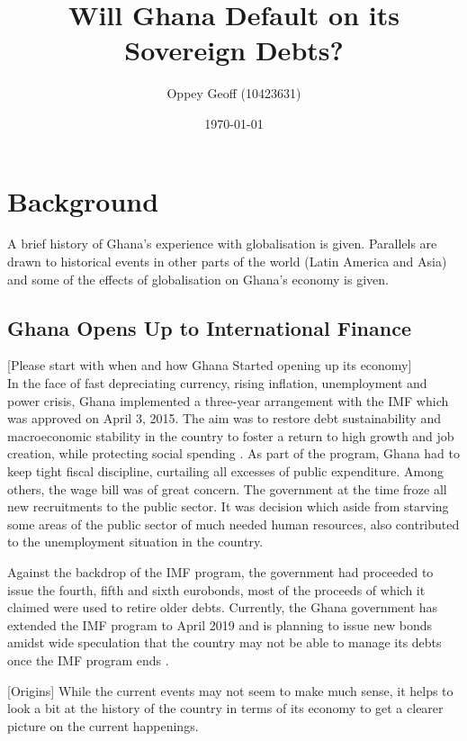 \documentclass[a4paper, 12pt]{article}
\author{Oppey Geoff (10423631)}
\title{Will Ghana Default on its Sovereign Debts?}
\date{\today}
\begin{document}
	\maketitle
	\clearpage
	\tableofcontents
	\newpage
	\doublespacing

	\section{Background}
	A brief history of Ghana's experience with globalisation is given. Parallels are drawn to historical events in other parts of the world (Latin America and Asia) and some of the effects of globalisation on Ghana's economy is given.
	
	\subsection{Ghana Opens Up to International Finance}
	[Please start with when and how Ghana Started opening up its economy]\\
	In the face of fast depreciating currency, rising inflation, unemployment and power crisis, Ghana implemented a three-year arrangement with the IMF which was approved on April 3, 2015. The aim was to restore debt sustainability and macroeconomic stability in the country to foster a return to high growth and job creation, while protecting social spending \cite{IMF2018}. As part of the program, Ghana had to keep tight fiscal discipline, curtailing all excesses of public expenditure. Among others, the wage bill was of great concern. The government at the time froze all new recruitments to the public sector. It was decision which aside from starving some areas of the public sector of much needed human resources, also contributed to the unemployment situation in the country.
	
	Against the backdrop of the IMF program, the government had proceeded to issue the fourth, fifth and sixth eurobonds, most of the proceeds of which it claimed were used to retire older debts. Currently, the Ghana government has extended the IMF program to April 2019 and is planning to issue new bonds amidst wide speculation that the country may not be able to manage its debts once the IMF program ends \cite{Dontoh2019Jan}.
	
	[Origins]
	While the current events may not seem  to make much sense, it helps to look a bit at the history of the country in terms of its economy to get a clearer picture on the current happenings.
	\cite{ThingsFallAp}
	\cite{hutchful1989revolution}
	
\end{document}
